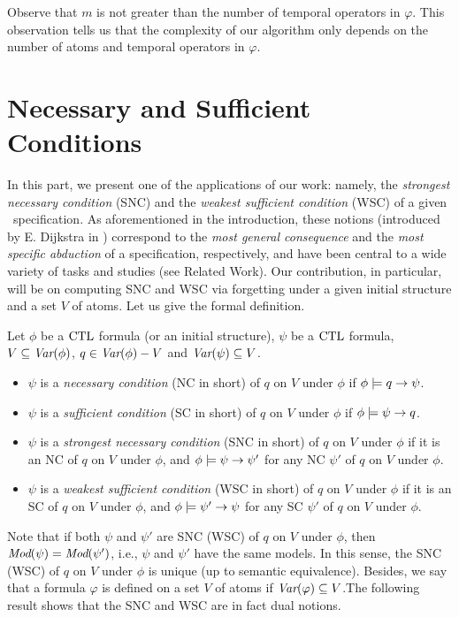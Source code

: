\documentclass[twoside,11pt]{article}
\begin{document}
Observe that $m$ is not greater than the number of  temporal  operators in $\varphi$.
This observation tells us that the complexity of our algorithm only depends on the number of atoms and temporal operators in $\varphi$.



	

	
	
	
	\section{Necessary and Sufficient Conditions}
	In this part, we present one of the applications of our work:  namely, the \emph{strongest necessary condition} (SNC) and the \emph{weakest sufficient condition}  (WSC)  of a given \CTL\ specification.  As aforementioned in the introduction, these notions (introduced by E. Dijkstra in \cite{DBLP:journals/cacm/Dijkstra75}) correspond to the \emph{most general consequence} and the \emph{most specific abduction} of a specification, respectively, and have been central to a wide variety of tasks and studies (see Related Work). Our contribution, in particular, will be on computing SNC and WSC via forgetting under a given initial structure and a set $V$ of atoms.  Let us give the formal definition.
	\begin{definition}\label{def:NC:SC}
		Let $\phi$ be a $\textrm{CTL}$ formula (or an initial structure), $\psi$ be a $\textrm{CTL}$ formula, $V \subseteq \textit{Var}(\phi)$, $q\in\textit{Var}(\phi)- V$
		and $\textit{Var}(\psi)\subseteq V$.
		\begin{itemize}
			\item $\psi$  is a {\em necessary condition} (NC in short) of $q$ on $V$ under $\phi$
			if $\phi \models q \rightarrow \psi$.
			\item $\psi$  is a {\em sufficient condition} (SC in short) of $q$ on $V$ under $\phi$
			if $\phi \models \psi\rightarrow q$.
			\item $\psi$  is a {\em strongest necessary condition} (SNC in short)
			of $q$ on $V$ under $\phi$
			if it is an NC of $q$ on $V$ under $\phi$, and $\phi\models\psi\rightarrow\psi'$
			for any NC $\psi'$ of $q$ on $V$ under $\phi$.
			
			\item $\psi$  is a {\em weakest sufficient condition} (WSC in short)
			of $q$ on $V$ under $\phi$
			if it is an SC of $q$ on $V$ under $\phi$, and $\phi\models\psi'\rightarrow\psi$
			for any SC $\psi'$ of $q$ on $V$ under $\phi$.
		\end{itemize}
	\end{definition}
	Note that if both $\psi$ and $\psi'$ are SNC (WSC) of $q$ on $V$ under $\phi$, then
	$\textit{Mod}(\psi)=\textit{Mod}(\psi')$, i.e., $\psi$ and $\psi'$ have the same models.
	In this sense, the SNC (WSC) of $q$ on $V$ under $\phi$ is unique (up to semantic equivalence).
	Besides, we say that a formula $\varphi$ is  defined on a set $V$ of atoms if $\textit{Var}(\varphi)\subseteq V$.The following result shows that the SNC and WSC are in fact dual notions.
	
\end{document}
